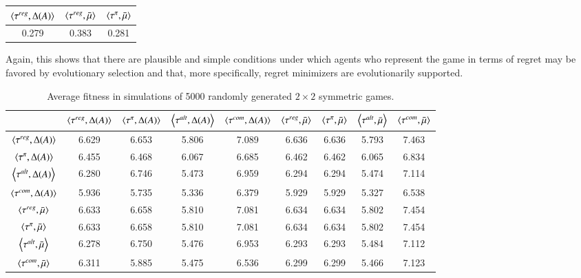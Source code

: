 \documentclass[fleqn,reqno,11pt]{article}
\begin{document}
\begin{center}
  \begin{tabular}{ccc}
    $\left \langle \tau^{reg}, \Delta(A)\right\rangle$ & $\left \langle \tau^{reg},
      \bar{\mu}\right\rangle$ & $\left \langle \tau^{\pi}, \bar{\mu}\right\rangle$ \\ \hline
    0.279  &   0.383 &    0.281 
  \end{tabular}
\end{center}

Again, this shows that there are plausible and simple conditions under which
agents who represent the game in terms of regret may be favored by
evolutionary selection and that, more specifically, regret minimizers
are evolutionarily supported.


\begin{table*}[ht]
\centering
\begin{tabular}{ccccccccc}
  \hline
 & $\left \langle \tau^{reg}, \Delta(A)\right\rangle$ 
 & $\left \langle \tau^{\pi}, \Delta(A)\right\rangle$ 
 & $\left \langle \tau^{alt}, \Delta(A)\right\rangle$
 & $\left \langle \tau^{com}, \Delta(A)\right\rangle$
 & $\left \langle \tau^{reg}, \bar{\mu}\right\rangle$ 
 & $\left \langle \tau^{\pi}, \bar{\mu}\right\rangle$ 
 & $\left \langle \tau^{alt}, \bar{\mu}\right\rangle$
 & $\left \langle \tau^{com}, \bar{\mu}\right\rangle$ \\ 
  \hline
  $\left \langle \tau^{reg}, \Delta(A)\right\rangle$ & 6.629 & 6.653 & 5.806 & 7.089 & 6.636 & 6.636 & 5.793 & 7.463 \\ 
  $\left \langle \tau^{\pi}, \Delta(A)\right\rangle$  & 6.455 & 6.468 & 6.067 & 6.685 & 6.462 & 6.462 & 6.065 & 6.834 \\ 
  $\left \langle \tau^{alt}, \Delta(A)\right\rangle$ & 6.280 & 6.746 & 5.473 & 6.959 & 6.294 & 6.294 & 5.474 & 7.114 \\ 
  $\left \langle \tau^{com}, \Delta(A)\right\rangle$ & 5.936 & 5.735 & 5.336 & 6.379 & 5.929 & 5.929 & 5.327 & 6.538 \\ 
  $\left \langle \tau^{reg}, \bar{\mu}\right\rangle$ & 6.633 & 6.658 & 5.810 & 7.081 & 6.634 & 6.634 & 5.802 & 7.454 \\ 
  $\left \langle \tau^{\pi}, \bar{\mu}\right\rangle$ & 6.633 & 6.658 & 5.810 & 7.081 & 6.634 & 6.634 & 5.802 & 7.454 \\ 
  $\left \langle \tau^{alt}, \bar{\mu}\right\rangle$ & 6.278 & 6.750 & 5.476 & 6.953 & 6.293 & 6.293 & 5.484 & 7.112 \\ 
  $\left \langle \tau^{com}, \bar{\mu}\right\rangle$ & 6.311 & 5.885 & 5.475 & 6.536 & 6.299 & 6.299 & 5.466 & 7.123 \\ 
   \hline
\end{tabular}
\caption{Average fitness in simulations of 5000
  randomly generated $2 \times 2$ symmetric games.}
\label{tab:Utils-MetaGame2}
\end{table*}
\end{document}
